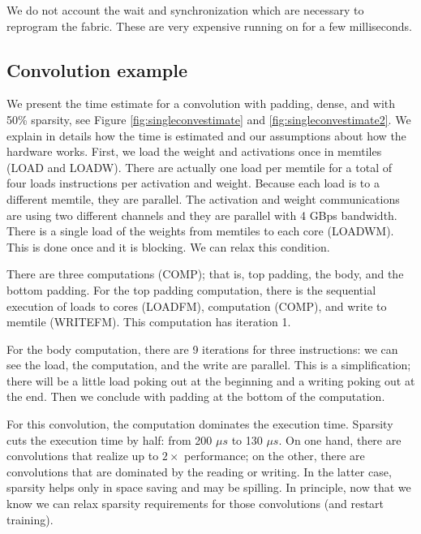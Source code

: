 \documentclass[sigconf]{acmart}
\begin{document}
We do not account the wait and synchronization which are necessary to
reprogram the fabric. These are very expensive running on for a few
milliseconds.


\subsection{Convolution example}

We present the time estimate for a convolution with padding, dense,
and with 50\% sparsity, see Figure \ref{fig:singleconvestimate} and
\ref{fig:singleconvestimate2}.  We explain in details how the time is
estimated and our assumptions about how the hardware works. First, we
load the weight and activations once in memtiles (LOAD and
LOADW). There are actually one load per memtile for a total of four
loads instructions per activation and weight. Because each load is to
a different memtile, they are parallel.  The activation and weight
communications are using two different channels and they are parallel
with 4 GBps bandwidth.  There is a single load of the weights from
memtiles to each core (LOADWM). This is done once and it is
blocking. We can relax this condition.



There are three computations (COMP); that is, top padding, the body,
and the bottom padding. For the top padding computation, there is the
sequential execution of loads to cores (LOADFM), computation (COMP),
and write to memtile (WRITEFM). This computation has iteration 1.

For the body computation, there are 9 iterations for three
instructions: we can see the load, the computation, and the write are
parallel. This is a simplification; there will be a little load poking
out at the beginning and a writing poking out at the end.  Then we
conclude with padding at the bottom of the computation.

For this convolution, the computation dominates the execution
time. Sparsity cuts the execution time by half: from 200 $\mu s$ to
130 $\mu s$. On one hand, there are convolutions that realize up to
$2\times$ performance; on the other, there are convolutions that are
dominated by the reading or writing. In the latter case, sparsity
helps only in space saving and may be spilling. In principle, now that
we know we can relax sparsity requirements for those convolutions (and
restart training).
\end{document}
